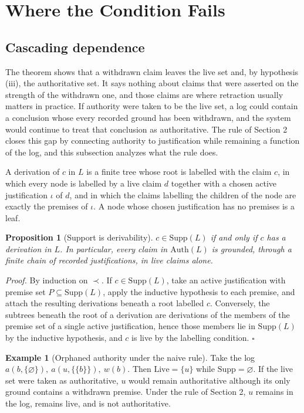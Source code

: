 \documentclass[11pt]{article}
\theoremstyle{plain}
\newtheorem{proposition}{Proposition}
\theoremstyle{definition}
\newtheorem{example}{Example}
\theoremstyle{remark}
\begin{document}
\section{Where the Condition Fails}
\subsection{Cascading dependence}
The theorem shows that a withdrawn claim leaves the live set and, by hypothesis (iii), the authoritative set. It says nothing about claims that were asserted on the strength of the withdrawn one, and those claims are where retraction usually matters in practice. If authority were taken to be the live set, a log could contain a conclusion whose every recorded ground has been withdrawn, and the system would continue to treat that conclusion as authoritative. The rule of Section 2 closes this gap by connecting authority to justification while remaining a function of the log, and this subsection analyzes what the rule does.

A derivation of $c$ in $L$ is a finite tree whose root is labelled with the claim $c$, in which every node is labelled by a live claim $d$ together with a chosen active justification $\iota$ of $d$, and in which the claims labelling the children of the node are exactly the premises of $\iota$. A node whose chosen justification has no premises is a leaf.

\begin{proposition}[Support is derivability]
$c\in\mathrm{Supp}(L)$ if and only if $c$ has a derivation in $L$. In particular, every claim in $\mathrm{Auth}(L)$ is grounded, through a finite chain of recorded justifications, in live claims alone.
\end{proposition}
\emph{Proof.} By induction on $\prec$. If $c\in\mathrm{Supp}(L)$, take an active justification with premise set $P\subseteq\mathrm{Supp}(L)$, apply the inductive hypothesis to each premise, and attach the resulting derivations beneath a root labelled $c$. Conversely, the subtrees beneath the root of a derivation are derivations of the members of the premise set of a single active justification, hence those members lie in $\mathrm{Supp}(L)$ by the inductive hypothesis, and $c$ is live by the labelling condition. \hfill$\square$

\begin{example}[Orphaned authority under the naive rule]
Take the log $a(b,\{\varnothing\}),\ a(u,\{\{b\}\}),\ w(b)$. Then $\mathrm{Live}=\{u\}$ while $\mathrm{Supp}=\varnothing$. If the live set were taken as authoritative, $u$ would remain authoritative although its only ground contains a withdrawn premise. Under the rule of Section 2, $u$ remains in the log, remains live, and is not authoritative.
\end{example}
\end{document}
